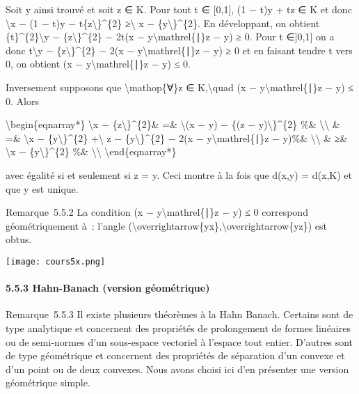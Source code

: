 \documentclass[]{article}
\begin{document}
Soit y ainsi trouvé et soit z ∈ K. Pour tout t ∈ {[}0,1{]}, (1 − t)y +
tz ∈ K et donc \textbackslash{}\textbar{}x − (1 − t)y −
t\{z\textbackslash{}\textbar{}\}\^{}\{2\} ≥\textbackslash{}\textbar{} x
− \{y\textbackslash{}\textbar{}\}\^{}\{2\}. En développant, on obtient
\{t\}\^{}\{2\}\textbackslash{}\textbar{}y −
\{z\textbackslash{}\textbar{}\}\^{}\{2\} − 2t(x −
y\textbackslash{}mathrel\{∣\}z − y) ≥ 0. Pour t ∈{]}0,1{]} on a donc
t\textbackslash{}\textbar{}y − \{z\textbackslash{}\textbar{}\}\^{}\{2\}
− 2(x − y\textbackslash{}mathrel\{∣\}z − y) ≥ 0 et en faisant tendre t
vers 0, on obtient (x − y\textbackslash{}mathrel\{∣\}z − y) ≤ 0.

Inversement supposons que \textbackslash{}mathop\{∀\}z ∈
K,\textbackslash{}quad (x − y\textbackslash{}mathrel\{∣\}z − y) ≤ 0.
Alors

\textbackslash{}begin\{eqnarray*\} \textbackslash{}\textbar{}x −
\{z\textbackslash{}\textbar{}\}\^{}\{2\}\& =\&
\textbackslash{}\textbar{}(x − y) − \{(z −
y)\textbackslash{}\textbar{}\}\^{}\{2\} \%\&
\textbackslash{}\textbackslash{} \& =\& \textbackslash{}\textbar{}x −
\{y\textbackslash{}\textbar{}\}\^{}\{2\} +\textbackslash{}\textbar{} z −
\{y\textbackslash{}\textbar{}\}\^{}\{2\} − 2(x −
y\textbackslash{}mathrel\{∣\}z − y)\%\& \textbackslash{}\textbackslash{}
\& ≥\& \textbackslash{}\textbar{}x −
\{y\textbackslash{}\textbar{}\}\^{}\{2\} \%\&
\textbackslash{}\textbackslash{} \textbackslash{}end\{eqnarray*\}

avec égalité si et seulement si z = y. Ceci montre à la fois que d(x,y)
= d(x,K) et que y est unique.

Remarque~5.5.2 La condition (x − y\textbackslash{}mathrel\{∣\}z − y) ≤ 0
correspond géométriquement à~: l'angle
(\textbackslash{}overrightarrow\{yx\},\textbackslash{}overrightarrow\{yz\})
est obtus.

\texttt{[image: cours5x.png]}

\paragraph{5.5.3 Hahn-Banach (version géométrique)}

Remarque~5.5.3 Il existe plusieurs théorèmes à la Hahn Banach. Certains
sont de type analytique et concernent des propriétés de prolongement de
formes linéaires ou de semi-normes d'un sous-espace vectoriel à l'espace
tout entier. D'autres sont de type géométrique et concernent des
propriétés de séparation d'un convexe et d'un point ou de deux convexes.
Nous avons choisi ici d'en présenter une version géométrique simple.
\end{document}
